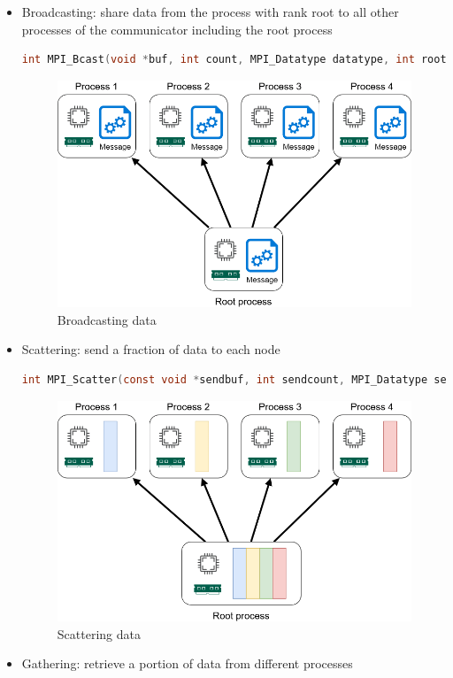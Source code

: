 \documentclass{article}
\begin{document}
\begin{itemize}
  \item Broadcasting: share data from the process with rank root to all other processes of the communicator including the root process
  \begin{lstlisting}[language=C]
int MPI_Bcast(void *buf, int count, MPI_Datatype datatype, int root, MPI_Comm comm)
  \end{lstlisting}
  \begin{figure}[h!]
    \center
    \includegraphics[width=0.65\linewidth]{images/2022-08-30-13-54-28.png}
    \caption{Broadcasting data}
  \end{figure}
  \FloatBarrier
  \item Scattering: send a fraction of data to each node
  \begin{lstlisting}[language=C]
int MPI_Scatter(const void *sendbuf, int sendcount, MPI_Datatype sendtype, void *recvbuf, int recvcount, MPI_Datatype recvtype, int root, MPI_Comm comm)
  \end{lstlisting}
  \begin{figure}[h!]
    \center
    \includegraphics[width=0.65\linewidth]{images/2022-08-30-14-03-58.png}
    \caption{Scattering data}
  \end{figure}
  \FloatBarrier
  \item Gathering: retrieve a portion of data from different processes
  \begin{lstlisting}[language=C]

\end{lstlisting}
\end{itemize}
\end{document}
